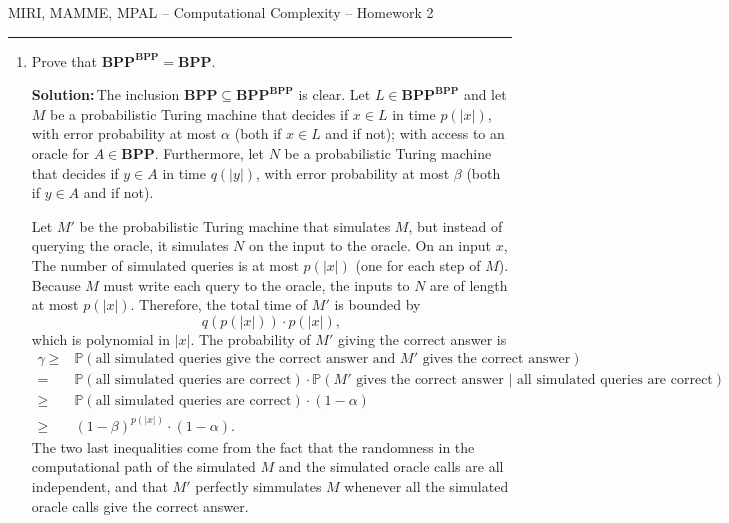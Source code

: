 \documentclass{amsart}
\theoremstyle{plain}
\theoremstyle{definition}
\newcommand{\bpp}{\textbf{BPP}}
\newcommand{\sol}{\textbf{Solution:\,}}
\begin{document}
    {\Large MIRI, MAMME, MPAL -- Computational Complexity -- Homework 2}

    \vspace{0.5cm}

    \hrule

    \vspace{0.5cm}

    \begin{enumerate}[label=\textbf{Exercise \arabic*:}, leftmargin=0cm, labelwidth=-0.2cm, align=left]

        \item
            Prove that $\bpp^{\bpp} = \bpp$.

            \sol The inclusion $\bpp \subseteq \bpp^{\bpp}$ is clear.
            Let $L \in \bpp^{\bpp}$ and let $M$ be a probabilistic Turing machine
            that decides if $x \in L$
            in time $p(|x|)$, with error probability at most $\alpha$
            (both if $x \in L$ and if not);
            with access to an oracle for
            $A \in \bpp$.
            Furthermore, let $N$ be a probabilistic Turing machine that decides if $y \in A$
            in time $q(|y|)$,
            with error probability at most $\beta$
            (both if $y \in A$ and if not).

            Let $M'$ be the probabilistic Turing machine that simulates $M$,
            but instead of querying the oracle, it simulates $N$ on the input
            to the oracle.
            On an input $x$,
            The number of simulated queries is at most $p(|x|)$
            (one for each step of $M$).
            Because $M$ must write each query to the oracle,
            the inputs to $N$ are of length at most $p(|x|)$.
            Therefore, the total time of $M'$ is bounded by
            \[
               q(p(|x|)) \cdot p(|x|),
            \]
            which is polynomial in $|x|$.
            The probability of $M'$ giving the correct answer is
            \begin{align*}
                \gamma \geq & \mathbb{P}(\text{all simulated queries give the correct answer and } M' \text{ gives the correct answer}) \\
                = & \mathbb{P}(\text{all simulated queries are correct}) \cdot \mathbb{P}(M' \text{ gives the correct answer } | \text{ all simulated queries are correct}) \\
                \geq & \mathbb{P}(\text{all simulated queries are correct}) \cdot (1 - \alpha) \\
                \geq & (1 - \beta)^{p(|x|)} \cdot (1 - \alpha).
            \end{align*}
            The two last inequalities come from the fact that the randomness in the computational path
            of the simulated $M$ and the simulated oracle calls are all independent, and that
            $M'$ perfectly simmulates $M$ whenever all the simulated oracle calls give the correct answer.


\end{enumerate}
\end{document}
